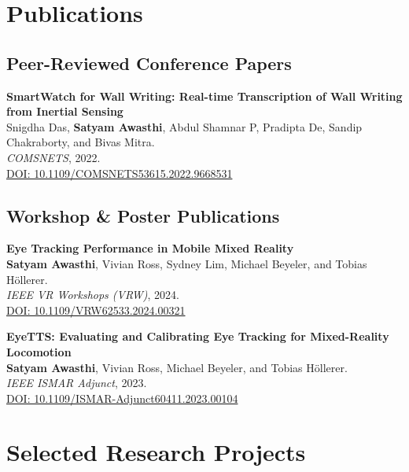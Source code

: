 \documentclass[10pt,letterpaper]{article}
\begin{document}
\section*{Publications}

\subsection*{Peer-Reviewed Conference Papers}

\noindent
\textbf{SmartWatch for Wall Writing:
Real-time Transcription of Wall Writing from Inertial Sensing}
\\
Snigdha Das,
\textbf{Satyam Awasthi},
Abdul Shamnar P,
Pradipta De,
Sandip Chakraborty,
and Bivas Mitra.
\\
\textit{COMSNETS}, 2022.
\\
\href{https://doi.org/10.1109/COMSNETS53615.2022.9668531}
{\color{accent}\footnotesize
DOI: 10.1109/COMSNETS53615.2022.9668531}

\vspace{-0.5em}

\subsection*{Workshop \& Poster Publications}

\noindent
\textbf{Eye Tracking Performance in Mobile Mixed Reality}
\\
\textbf{Satyam Awasthi},
Vivian Ross,
Sydney Lim,
Michael Beyeler,
and Tobias H\"ollerer.
\\
\textit{IEEE VR Workshops (VRW)}, 2024.
\\
\href{https://doi.org/10.1109/VRW62533.2024.00321}
{\color{accent}\footnotesize
DOI: 10.1109/VRW62533.2024.00321}

\medskip

\noindent
\textbf{EyeTTS:
Evaluating and Calibrating Eye Tracking for Mixed-Reality Locomotion}
\\
\textbf{Satyam Awasthi},
Vivian Ross,
Michael Beyeler,
and Tobias H\"ollerer.
\\
\textit{IEEE ISMAR Adjunct}, 2023.
\\
\href{https://doi.org/10.1109/ISMAR-Adjunct60411.2023.00104}
{\color{accent}\footnotesize
DOI: 10.1109/ISMAR-Adjunct60411.2023.00104}


\section*{Selected Research Projects}
\end{document}
